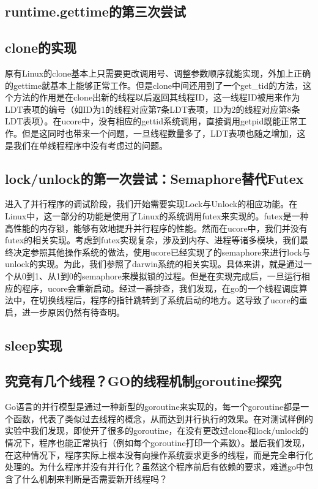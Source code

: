 \documentclass{article}
\begin{document}
\subsection{runtime.gettime的第三次尝试}

\subsection{clone的实现}
原有Linux的clone基本上只需要更改调用号、调整参数顺序就能实现，外加上正确的gettime就基本上能够正常工作。但是clone中间还用到了一个get\_tid的方法，这个方法的作用是在clone出新的线程以后返回其线程ID，这一线程ID被用来作为LDT表项的编号（如ID为1的线程对应第7条LDT表项，ID为2的线程对应第8条LDT表项）。在ucore中，没有相应的gettid系统调用，直接调用getpid既能正常工作。但是这同时也带来一个问题，一旦线程数量多了，LDT表项也随之增加，这是我们在单线程程序中没有考虑过的问题。

\subsection{lock/unlock的第一次尝试：Semaphore替代Futex}
进入了并行程序的调试阶段，我们开始需要实现Lock与Unlock的相应功能。在Linux中，这一部分的功能是使用了Linux的系统调用futex来实现的。futex是一种高性能的内存锁，能够有效地提升并行程序的性能。然而在ucore中，我们并没有futex的相关实现。考虑到futex实现复杂，涉及到内存、进程等诸多模块，我们最终决定参照其他操作系统的做法，使用ucore已经实现了的semaphore来进行lock与unlock的实现。为此，我们参照了darwin系统的相关实现。具体来讲，就是通过一个从0到1、从1到0的semaphore来模拟锁的过程。但是在实现完成后，一旦运行相应的程序，ucore会重新启动。经过一番排查，我们发现，在go的一个线程调度算法中，在切换线程后，程序的指针跳转到了系统启动的地方。这导致了ucore的重启，进一步原因仍然有待查明。

\subsection{sleep实现}

\subsection{究竟有几个线程？GO的线程机制goroutine探究}
Go语言的并行模型是通过一种新型的goroutine来实现的，每一个goroutine都是一个函数，代表了类似过去线程的概念，从而达到并行执行的效果。在对测试样例的实验中我们发现，即使开了很多的goroutine，在没有更改过clone和lock/unlock的情况下，程序也能正常执行（例如每个goroutine打印一个素数）。最后我们发现，在这种情况下，程序实际上根本没有向操作系统要求更多的线程，而是完全串行化处理的。为什么程序并没有并行化？虽然这个程序前后有依赖的要求，难道go中包含了什么机制来判断是否需要新开线程吗？
\end{document}
